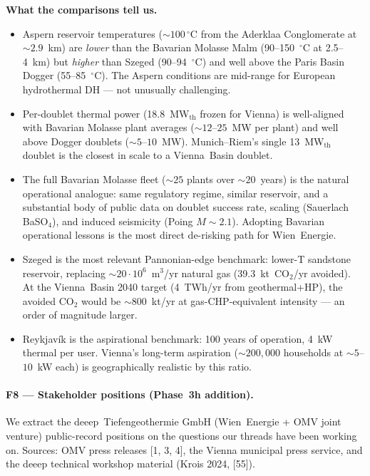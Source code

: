 \documentclass{article}
\begin{document}
\textbf{What the comparisons tell us.}
\begin{itemize}
\item Aspern reservoir temperatures ($\sim 100\,^\circ$C from the
Aderklaa Conglomerate at $\sim 2.9$~km) are \emph{lower} than the
Bavarian Molasse Malm (90--150~$^\circ$C at 2.5--4~km) but
\emph{higher} than Szeged (90--94~$^\circ$C) and well above the Paris
Basin Dogger (55--85~$^\circ$C). The Aspern conditions are mid-range
for European hydrothermal DH --- not unusually challenging.
\item Per-doublet thermal power (18.8~MW$_{\mathrm{th}}$ frozen for
Vienna) is well-aligned with Bavarian Molasse plant averages
($\sim 12$--$25$~MW per plant) and well above Dogger doublets
($\sim 5$--$10$~MW). Munich--Riem's single 13~MW$_{\mathrm{th}}$
doublet is the closest in scale to a Vienna~Basin doublet.
\item The full Bavarian Molasse fleet ($\sim 25$ plants over
$\sim 20$~years) is the natural operational analogue: same regulatory
regime, similar reservoir, and a substantial body of public data on
doublet success rate, scaling (Sauerlach BaSO$_4$), and induced
seismicity (Poing $M\sim 2.1$). Adopting Bavarian operational lessons
is the most direct de-risking path for Wien~Energie.
\item Szeged is the most relevant Pannonian-edge benchmark: lower-T
sandstone reservoir, replacing $\sim 20\cdot 10^{6}$~m$^3$/yr natural
gas (39.3~kt~CO$_2$/yr avoided). At the Vienna~Basin 2040 target
(4~TWh/yr from geothermal+HP), the avoided CO$_2$ would be
$\sim 800$~kt/yr at gas-CHP-equivalent intensity --- an order of
magnitude larger.
\item Reykjav\'ik is the aspirational benchmark: 100 years of
operation, 4~kW thermal per user. Vienna's long-term aspiration
($\sim 200{,}000$ households at $\sim 5$--$10$~kW each) is
geographically realistic by this ratio.
\end{itemize}

\paragraph{F8 --- Stakeholder positions (Phase~3h addition).}
We extract the deeep~Tiefengeothermie GmbH (Wien~Energie + OMV
joint venture) public-record positions on the questions our threads
have been working on. Sources: OMV press releases [1, 3, 4], the
Vienna municipal press service, and the deeep technical workshop
material (Krois 2024, [55]).
\end{document}

